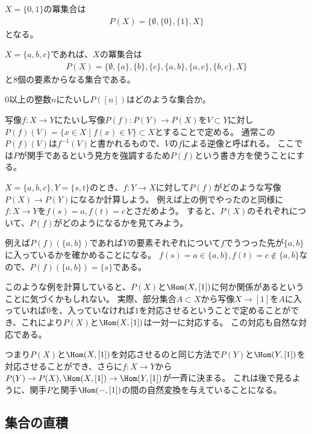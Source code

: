 \documentclass[uplatex]{jsarticle}
\begin{document}
\begin{eg}
$X=\{0,1\}$の冪集合は
\begin{align*}
P(X)=\{\emptyset, \{0\},\{1\},X\}
\end{align*}
となる。

$X=\{a,b,c\}$であれば、$X$の冪集合は
\begin{align*}
P(X)=\{\emptyset, \{a\}, \{b\}, \{c\}, \{a,b\}, \{a,c\}, \{b,c\}, X\}
\end{align*}
と$8$個の要素からなる集合である。
\end{eg}

\begin{prob}
$0$以上の整数$n$にたいし$P([n])$はどのような集合か。
\end{prob}


写像$f\colon X\to Y$にたいし写像$P(f)\colon P(Y)\to P(X)$を$V\subset Y$に対し$P(f)(V)=\{x\in X\mid f(x)\in V\}\subset X$とすることで定める。
通常この$P(f)(V)$は$f^{-1}(V)$と書かれるもので、$V$の$f$による逆像と呼ばれる。
ここでは$P$が関手であるという見方を強調するため$P(f)$という書き方を使うことにする。

\begin{prob}
$X=\{a,b,c\}, Y=\{s,t\}$のとき、$f:Y \to X$に対して$P(f)$がどのような写像$P(X) \to P(Y)$になるか計算しよう。
例えば上の例でやったのと同様に$f:X \to Y$を$f(s)=a, f(t)=c$とさだめよう。
すると、$P(X)$のそれぞれについて、$P(f)$がどのようになるかを見てみよう。

例えば$P(f)(\{a,b\})$であれば$Y$の要素それぞれについて$f$でうつった先が$\{a,b\}$に入っているかを確かめることになる。
$f(s)=a \in \{a,b\}, f(t)=c\notin\{a,b\}$なので、$P(f)(\{a,b\})=\{s\}$である。
\end{prob}

このような例を計算していると、$P(X)$と$\Hom(X,[1])$に何か関係があるということに気づくかもしれない。
実際、部分集合$A \subset X$から写像$X \to [1]$を$A$に入っていれば$0$を、入っていなければ$1$を対応させるということで定めることができ、これにより$P(X)$と$\Hom(X,[1])$は一対一に対応する。
この対応も自然な対応である。

つまり$P(X)$と$\Hom(X,[1])$を対応させるのと同じ方法で$P(Y)$と$\Hom(Y,[1])$を対応させることができ、さらに$f:X \to Y$から$P(Y) \to P(X), \Hom(X,[1]) \to \Hom(Y,[1])$が一斉に決まる。
これは後で見るように、関手$P$と関手$\Hom(-,[1])$の間の自然変換を与えていることになる。

\subsection{集合の直積}
\end{document}
